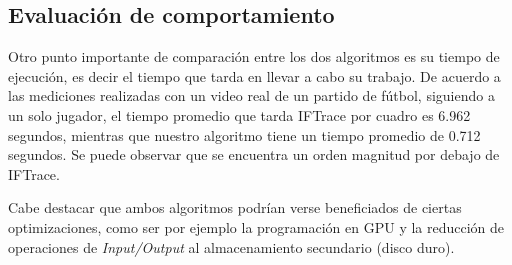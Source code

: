 \subsection{Evaluación de comportamiento}

Otro punto importante de comparación entre los dos algoritmos es su tiempo de
ejecución, es decir el tiempo que tarda en llevar a cabo su trabajo.  De
acuerdo a las mediciones realizadas con un video real de un partido de fútbol,
siguiendo a un solo jugador, el tiempo promedio que tarda IFTrace por cuadro es
6.962 segundos, mientras que nuestro algoritmo tiene un tiempo promedio de
0.712 segundos. Se puede observar que se encuentra un orden magnitud por debajo
de IFTrace.

Cabe destacar que ambos algoritmos podrían verse beneficiados de ciertas
optimizaciones, como ser por ejemplo la programación en GPU y la reducción de
operaciones de \textit{Input/Output} al almacenamiento secundario (disco duro).

